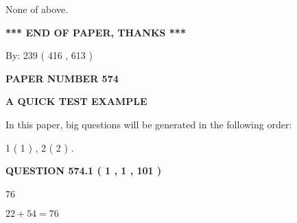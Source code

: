 \documentclass[12pt]{article}
\begin{document}
  
 
 
\noindent{}
 
 
 None of above.
 
 
 
 
   
   
 \vspace{0.2in}
 
   
   
   
   
\vspace{1.0in} 
{\textbf{\large{ *** END OF PAPER, THANKS *** }}} 
   
   
\hspace{1.0in} By: 
 239 ( 416 ,  613 )
   
   
   
   
\newpage 
\setcounter{page}{ 
   574001 } 
   
   
   
   
 {\textbf{ \Large{ PAPER NUMBER  574  }}}
   
   
\vspace{0.2in}
   
   
   
   
   
   
 \vspace{0.2in}
{\LARGE {\textbf{ A QUICK TEST EXAMPLE}}}
   
   
   
\vspace{0.2in}
   
In this paper, big questions will be generated in the following order: 
   
   
   1 ( 1 )
 ,
   2 ( 2 )
 .
  
\vspace{0.2in}
  
{\textbf{\Large{QUESTION
574.1 
 ( 1 , 1 , 101 )
}}}
  
  
 
 
\noindent{}

76
 
 
 
 
\noindent{}

$ %
22 +  %
54=   %
76$
 
\end{document}
